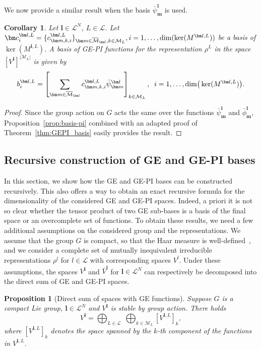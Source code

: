 \documentclass{article}
\newcommand{\rep}[2]{\rho^{#1}_{#2}}
\newcommand{\bphi}[2]{\bar\phi^{#1}_{#2}}
\newcommand{\bpsi}[2]{\bar\psi^{#1}_{#2}}
\newcommand{\bV}{{\bar V}}
\newcommand{\card}[1]{|{#1}|}
\newtheorem{proposition}[theorem]{Proposition}
\newtheorem{corollary}[theorem]{Corollary}
\numberwithin{equation}{section}
\def\bc{{\bm c}}
\def\bl{{\bm l}}
\def\bbm{{\bm m}}
\def\calM{\mathcal{M}}
\def\calL{\mathcal{L}}
\def\oMl{\overline{\calM}_\bl}
\def\Nat{{N}}
\def\dim{{{\rm dim}}}
\begin{document}
{We now provide a similar result when the basis $\bpsi{\bl}{\bbm}$ is used.
\begin{corollary}
    Let $\bl\in\calL^\Nat$, $L\in\calL$.
    Let $\bc^{\bl,L}_i = \{c_{\bbm,k,i}^{\bl,L}\}_{\bbm\in\oMl,k\in\calM_L}, i=1,\ldots, \dim(\ker(M^{\bl,L}))$ be a basis of $\ker(M^{\bl,L})$. 
    A basis of GE-PI
    functions for the representation $\rep{L}{}$ in the space $\left[V^\bl\right]^{\card{\calM_L}}$ is
    given by
    \[
    b^{\bl,L}_i = 
    \left[ 
    \sum_{\bbm \in \oMl}c_{\bbm,k,i}^{\bl,L} \bpsi{\bl}{\bbm}\right]_{k\in \calM_L},\;\; i=1,\ldots,\dim\big(\ker(M^{\bl,L})\big).
    \]
\end{corollary}

\begin{proof}
    Since the group action on $G$ acts the same over the functions $\bpsi{\bl}{\bbm}$ and $\bphi{\bl}{\bbm}$, Proposition~\ref{prop:basis-pi} combined with an adapted proof of Theorem~\ref{thm:GEPI_basis} easily provides the result.
\end{proof}



\subsection{Recursive construction of GE and GE-PI bases}


In this section, we show how the GE and GE-PI bases can be constructed recursively. This also offers a way to obtain an exact recursive formula for the dimensionality of the considered GE and GE-PI spaces. 
Indeed, a priori it is not so clear whether the tensor product of two GE sub-bases is a basis of the final space or an overcomplete set of functions. To obtain these results, we need a few additional assumptions on the considered group and the representations. We assume that the group $G$ is compact, so that the Haar measure is well-defined~\cite[Chapter 4]{Hall2013-af}, and we consider a complete set of mutually inequivalent irreducible representations $\rep{l}{}$ for $l\in \calL$ with corresponding spaces $V^l$.
Under these assumptions, the spaces $V^\bl$ and $\bV^\bl$ for $\bl\in\calL^N$ can respectively be decomposed into the direct sum of GE and GE-PI spaces.


\begin{proposition}[Direct sum of spaces with GE functions]\label{prop:direct_sum}
    Suppose $G$ is a 
    compact Lie group,
    $\bl 
    \in \calL^\Nat$ and 
    $V^\bl$ is stable by group action. 
    There holds 
    \begin{equation}
    \label{eq:direct_sum_GE}
        V^{\bl} = \bigoplus_{L \in \calL}  
        \;
        \bigoplus_{k\in \calM_L} [V^{\bl,L}]_k, 
    \end{equation}
    where $[V^{\bl,L}]_k$ denotes the space spanned by the $k$-th component of the functions in $V^{\bl,L}$.
\end{proposition}

}
\end{document}
